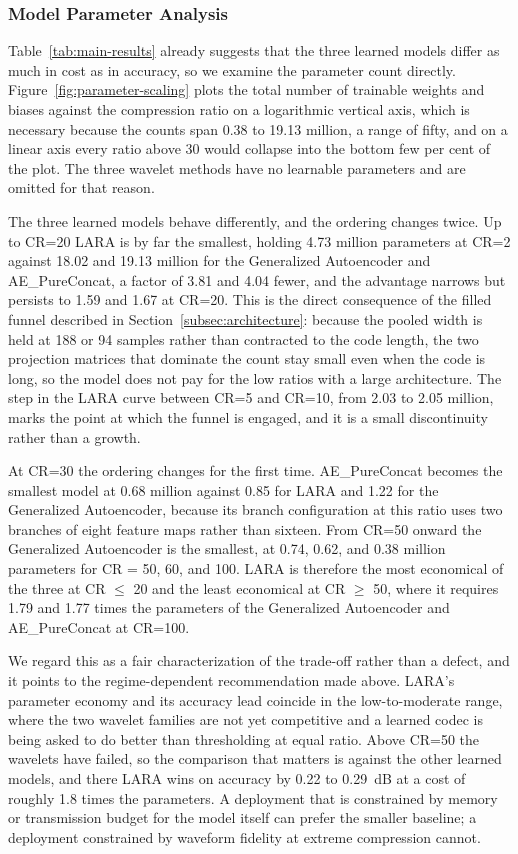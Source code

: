 \documentclass[fleqn,10pt]{wlscirep}
\begin{document}
\subsubsection{Model Parameter Analysis}

Table~\ref{tab:main-results} already suggests that the three learned models differ as much in cost as in accuracy, so we examine the parameter count directly. Figure~\ref{fig:parameter-scaling} plots the total number of trainable weights and biases against the compression ratio on a logarithmic vertical axis, which is necessary because the counts span 0.38 to 19.13 million, a range of fifty, and on a linear axis every ratio above 30 would collapse into the bottom few per cent of the plot. The three wavelet methods have no learnable parameters and are omitted for that reason.

The three learned models behave differently, and the ordering changes twice. Up to CR=20 LARA is by far the smallest, holding 4.73 million parameters at CR=2 against 18.02 and 19.13 million for the Generalized Autoencoder and AE\_PureConcat, a factor of 3.81 and 4.04 fewer, and the advantage narrows but persists to 1.59 and 1.67 at CR=20. This is the direct consequence of the filled funnel described in Section~\ref{subsec:architecture}: because the pooled width is held at 188 or 94 samples rather than contracted to the code length, the two projection matrices that dominate the count stay small even when the code is long, so the model does not pay for the low ratios with a large architecture. The step in the LARA curve between CR=5 and CR=10, from 2.03 to 2.05 million, marks the point at which the funnel is engaged, and it is a small discontinuity rather than a growth.

At CR=30 the ordering changes for the first time. AE\_PureConcat becomes the smallest model at 0.68 million against 0.85 for LARA and 1.22 for the Generalized Autoencoder, because its branch configuration at this ratio uses two branches of eight feature maps rather than sixteen. From CR=50 onward the Generalized Autoencoder is the smallest, at 0.74, 0.62, and 0.38 million parameters for CR = 50, 60, and 100. LARA is therefore the most economical of the three at CR $\leq$ 20 and the least economical at CR $\geq$ 50, where it requires 1.79 and 1.77 times the parameters of the Generalized Autoencoder and AE\_PureConcat at CR=100.

We regard this as a fair characterization of the trade-off rather than a defect, and it points to the regime-dependent recommendation made above. LARA's parameter economy and its accuracy lead coincide in the low-to-moderate range, where the two wavelet families are not yet competitive and a learned codec is being asked to do better than thresholding at equal ratio. Above CR=50 the wavelets have failed, so the comparison that matters is against the other learned models, and there LARA wins on accuracy by 0.22 to 0.29~dB at a cost of roughly 1.8 times the parameters. A deployment that is constrained by memory or transmission budget for the model itself can prefer the smaller baseline; a deployment constrained by waveform fidelity at extreme compression cannot.
\end{document}
